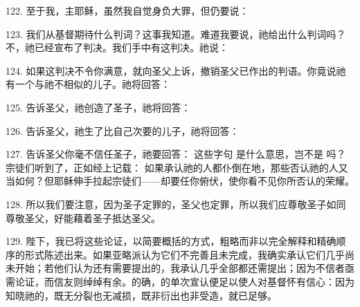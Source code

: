 122. 至于我，主耶稣，虽然我自觉身负大罪，但仍要说：\par

\par

123. 我们从基督期待什么判词？这事我知道。难道我要说，祂给出什么判词吗？不，祂已经宣布了判决。我们手中有这判决。祂说： \par

124. 如果这判决不令你满意，就向圣父上诉，撤销圣父已作出的判语。你竟说祂有一个与祂不相似的儿子。祂将回答： \par

125. 告诉圣父，祂创造了圣子，祂将回答：\par

126. 告诉圣父，祂生了比自己次要的儿子，祂将回答：\par

127. 告诉圣父你毫不信任圣子，祂要回答：  这些字句  是什么意思，岂不是  吗？宗徒们听到了，正如经上记载：  如果承认祂的人都仆倒在地，那些否认祂的人又当如何？但耶稣伸手拉起宗徒们——却要任你俯伏，使你看不见你所否认的荣耀。\par

128. 所以我们要注意，因为圣子定罪的，圣父也定罪，所以我们应尊敬圣子如同尊敬圣父，好能藉着圣子抵达圣父。\par

\par

129. 陛下，我已将这些论证，以简要概括的方式，粗略而非以完全解释和精确顺序的形式陈述出来。如果亚略派认为它们不完善且未完成，我确实承认它们几乎尚未开始；若他们认为还有需要提出的，我承认几乎全部都还需提出；因为不信者亟需论证，而信友则绰绰有余。的确，的单次宣认便足以使人对基督怀有信心：因为知晓祂的，既无分裂也无减损，既非衍出也非受造，就已足够。\par

